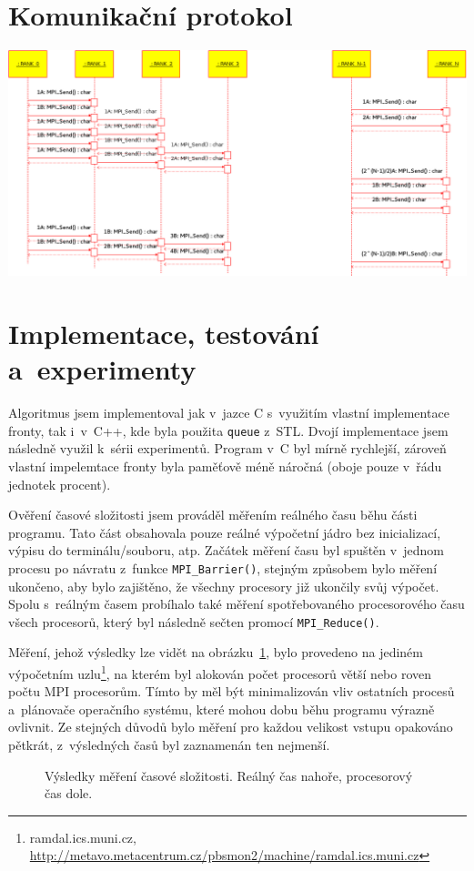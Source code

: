 \documentclass[a4paper, 12pt]{article}[21.3.2015]
\begin{document}
\section{Komunikační protokol} \label{protocol}
\includegraphics[width=\textwidth]{sequence_diagram}

\section{Implementace, testování a~experimenty} \label{experiments}
Algoritmus jsem implementoval jak v~jazce C s~využitím vlastní implementace fronty, tak i~v~C++, kde byla použita \texttt{queue} z~STL. Dvojí implementace jsem následně využil k~sérii experimentů. Program v~C byl mírně rychlejší, zároveň vlastní impelemtace fronty byla paměťově méně náročná (oboje pouze v~řádu jednotek procent).

Ověření časové složitosti jsem prováděl měřením reálného času běhu části programu. Tato část obsahovala pouze reálné výpočetní jádro bez inicializací, výpisu do terminálu/souboru, atp. Začátek měření času byl spuštěn v~jednom procesu po návratu z~funkce \texttt{MPI\_Barrier()}, stejným způsobem bylo měření ukončeno, aby bylo zajištěno, že všechny procesory již ukončily svůj výpočet. Spolu s~reálným časem probíhalo také měření spotřebovaného procesorového času všech procesorů, který byl následně sečten promocí \texttt{MPI\_Reduce()}.

Měření, jehož výsledky lze vidět na obrázku~\ref{complexity}, bylo provedeno na jediném výpočetním uzlu\footnote{ramdal.ics.muni.cz, \url{http://metavo.metacentrum.cz/pbsmon2/machine/ramdal.ics.muni.cz}}, na kterém byl alokován počet procesorů větší nebo roven počtu MPI procesorům. Tímto by měl být minimalizován vliv ostatních procesů a~plánovače operačního systému, které mohou dobu běhu programu výrazně ovlivnit. Ze stejných důvodů bylo měření pro každou velikost vstupu opakováno pětkrát, z~výsledných časů byl zaznamenán ten nejmenší.
\begin{figure}
	\centering
	\resizebox{\textwidth}{!}{} %
	\caption{Výsledky měření časové složitosti. Reálný čas nahoře, procesorový čas dole.}
	\label{complexity}
\end{figure}
\end{document}
